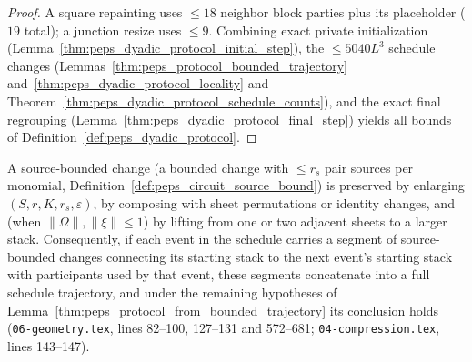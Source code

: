 \begin{proof}\leanok
    A square repainting uses $\le 18$ neighbor block parties plus its placeholder ($19$ total); a junction resize uses $\le 9$. Combining exact private initialization (Lemma~\ref{thm:peps_dyadic_protocol_initial_step}), the $\le 5040L^3$ schedule changes (Lemmas~\ref{thm:peps_protocol_bounded_trajectory} and~\ref{thm:peps_dyadic_protocol_locality} and Theorem~\ref{thm:peps_dyadic_protocol_schedule_counts}), and the exact final regrouping (Lemma~\ref{thm:peps_dyadic_protocol_final_step}) yields all bounds of Definition~\ref{def:peps_dyadic_protocol}.
\end{proof}

\begin{lemma}
    \label{thm:peps_protocol_event_segments}
    \leanok
    A source-bounded change (a bounded change with $\le r_s$ pair sources per monomial, Definition~\ref{def:peps_circuit_source_bound}) is preserved by enlarging $(S,r,K,r_s,\varepsilon)$, by composing with sheet permutations or identity changes, and (when $\lVert\Omega\rVert,\lVert\xi\rVert\le1$) by lifting from one or two adjacent sheets to a larger stack. Consequently, if each event in the schedule carries a segment of source-bounded changes connecting its starting stack to the next event's starting stack with participants used by that event, these segments concatenate into a full schedule trajectory, and under the remaining hypotheses of Lemma~\ref{thm:peps_protocol_from_bounded_trajectory} its conclusion holds (\texttt{06-geometry.tex}, lines 82--100, 127--131 and 572--681; \texttt{04-compression.tex}, lines 143--147).
\end{lemma}

